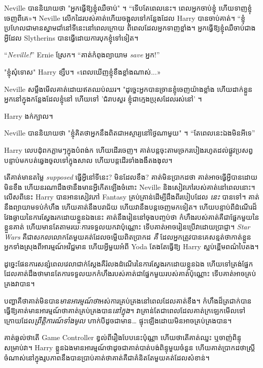{Neville បាននិយាយថា "អ្នកធ្វើឱ្យខ្ញុំឈឺចាប់" ។ “ទើបតែពេលនេះ។ ពេល​អ្នក​ចាប់​ខ្ញុំ ហើយ​ទាញ​ខ្ញុំ​ចេញ​ពី​គេ»។ Neville លើកដៃរបស់គាត់ហើយចង្អុលទៅកន្លែងដែល Harry បានចាប់គាត់។ “ខ្ញុំប្រហែលជាមានស្នាមជាំនៅទីនេះនៅពេលក្រោយ ពីពេលដែលអ្នកទាញខ្លាំង។ អ្នកធ្វើឱ្យខ្ញុំឈឺចាប់ជាងអ្វីដែល Slytherins បានធ្វើដោយការបុកខ្ញុំទៅទៀត។

“\emph{Neville!}” Ernie ស្រែក។ “គាត់កំពុងព្យាយាម \emph{save} អ្នក!”

"ខ្ញុំសុំទោស" Harry ខ្សឹប។ «ពេល​ឃើញ​ខ្ញុំ​ខឹង​ខ្លាំង​ណាស់...»

Neville សម្លឹងមើលគាត់ដោយឥតឈប់ឈរ។ "ដូច្នេះអ្នកបានច្រានខ្ញុំចេញយ៉ាងខ្លាំង ហើយដាក់ខ្លួនអ្នកនៅក្នុងកន្លែងដែលខ្ញុំនៅ ហើយទៅ 'ជំរាបសួរ ខ្ញុំជាក្មេងប្រុសដែលរស់នៅ' ។

Harry ងក់ក្បាល។

Neville បាននិយាយថា "ខ្ញុំគិតថាអ្នកនឹងពិតជាអស្ចារ្យនៅថ្ងៃណាមួយ" ។ “តែពេលនេះឯងមិនអីទេ”

Harry លេប​ដុំ​ពក​ភ្លាមៗ​ក្នុង​បំពង់ក ហើយ​ដើរ​ចេញ។ គាត់បន្តចុះតាមច្រករបៀងរហូតដល់ផ្លូវប្រសព្វ បន្ទាប់មកបត់ឆ្វេងចូលទៅក្នុងសាល ហើយបន្តដើរទាំងងងឹតងងុល។

តើគាត់មានតម្លៃ \emph{supposed} ធ្វើអ្វីនៅទីនេះ? មិនដែលខឹង? គាត់​មិន​ប្រាកដ​ថា គាត់​អាច​ធ្វើ​អ្វី​បាន​ដោយ​មិន​ខឹង ហើយ​នរណា​ដឹង​ថា​នឹង​មាន​អ្វី​កើត​ឡើង​ចំពោះ Neville និង​សៀវភៅ​របស់​គាត់​នៅ​ពេល​នោះ។ លើសពីនេះ Harry បានអានសៀវភៅ Fantasy គ្រប់គ្រាន់ដើម្បីដឹងពីរបៀបដែល \emph{នេះ} បានទៅ។ គាត់​នឹង​ព្យាយាម​ទប់​កំហឹង ហើយ​គាត់​នឹង​បរាជ័យ ហើយ​វា​នឹង​បន្ត​ចេញ​មក​ទៀត​។ ហើយបន្ទាប់ពីដំណើរដ៏វែងឆ្ងាយនៃការស្វែងរកដោយខ្លួនឯងនេះ គាត់នឹងរៀននៅចុងបញ្ចប់ថា កំហឹងរបស់គាត់គឺជាផ្នែកមួយនៃខ្លួនគាត់ ហើយមានតែតាមរយៈការទទួលយកវាប៉ុណ្ណោះ ទើបគាត់អាចរៀនប្រើវាដោយប្រាជ្ញា។ \emph{Star Wars} គឺជាសកលលោកតែមួយគត់ដែលចម្លើយពិតប្រាកដ \emph{គឺ} ដែលអ្នកត្រូវបានគេសន្មត់ថាកាត់ខ្លួនអ្នកទាំងស្រុងពីអារម្មណ៍អវិជ្ជមាន ហើយអ្វីមួយអំពី Yoda តែងតែធ្វើឱ្យ Harry ស្អប់ខ្ពើមពណ៌បៃតង។

ដូច្នេះផែនការសន្សំពេលវេលាជាក់ស្តែងគឺរំលងដំណើរនៃការស្វែងរកដោយខ្លួនឯង ហើយទៅត្រង់ផ្នែកដែលគាត់ដឹងថាមានតែការទទួលយកកំហឹងរបស់គាត់ជាផ្នែកមួយរបស់គាត់ប៉ុណ្ណោះ ទើបគាត់អាចគ្រប់គ្រងវាបាន។

បញ្ហាគឺថាគាត់មិនបាន\emph{មានអារម្មណ៍ថា}អស់ការគ្រប់គ្រងនៅពេលដែលគាត់ខឹង។ កំហឹងដ៏ត្រជាក់បានធ្វើឱ្យគាត់មានអារម្មណ៍ថាគាត់គ្រប់គ្រងបាន\emph{នៅក្នុង}។ វាគ្រាន់តែជាពេលដែលគាត់ក្រឡេកមើលទៅក្រោយដែល\emph{ព្រឹត្តិការណ៍ទាំងមូល} ហាក់បីដូចជាមាន… ផ្ទុះឡើងដោយមិនអាចគ្រប់គ្រងបាន។

គាត់ឆ្ងល់ថាតើ Game Controller ខ្វល់ពីរឿងបែបនេះប៉ុណ្ណា ហើយថាតើគាត់ឈ្នះ ឬចាញ់ពិន្ទុសម្រាប់វា។ Harry ខ្លួនឯងមានអារម្មណ៍ថាដូចជាគាត់បាត់បង់ពិន្ទុមួយចំនួន ហើយគាត់ប្រាកដថាស្ត្រីចំណាស់នៅក្នុងរូបភាពនឹងបានប្រាប់គាត់ថាគាត់គឺជាគំនិតតែមួយគត់ដែលសំខាន់។

}
